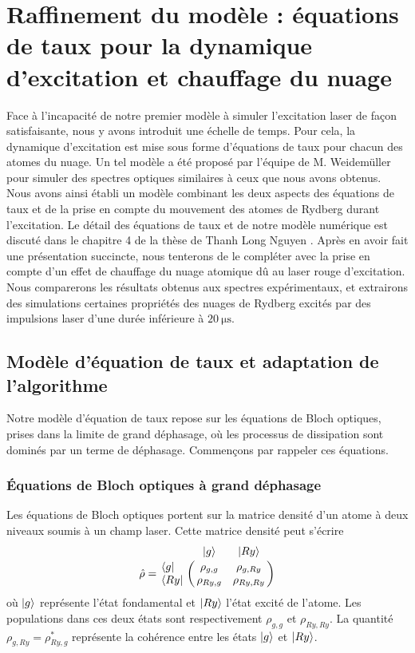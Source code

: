 \section{Raffinement du modèle : équations de taux pour la dynamique d'excitation et chauffage du nuage}
\noindent Face à l'incapacité de notre premier modèle à simuler l'excitation laser de façon satisfaisante, nous y avons introduit une échelle de temps.
Pour cela, la dynamique d'excitation est mise sous forme d'équations de taux pour chacun des atomes du nuage.
Un tel modèle a été proposé par l'équipe de M. Weidemüller \cite{MX_WEIDEMULLERRYDAGREGATES14} pour simuler des spectres optiques similaires à ceux que nous avons obtenus.
Nous avons ainsi établi un modèle combinant les deux aspects des équations de taux et de la prise en compte du mouvement des atomes de Rydberg durant l'excitation.
Le détail des équations de taux et de notre modèle numérique est discuté dans le chapitre 4 de la thèse de Thanh Long Nguyen \cite{PHD_NGUYEN}.
Après en avoir fait une présentation succincte, nous tenterons de le compléter avec la prise en compte d'un effet de chauffage du nuage atomique dû au laser rouge d'excitation.
Nous comparerons les résultats obtenus aux spectres expérimentaux, et extrairons des simulations certaines propriétés des nuages de Rydberg excités par des impulsions laser d'une durée inférieure à $\SI{20}{\us}$.
	
	\subsection{Modèle d'équation de taux et adaptation de l'algorithme}\label{subsec:rate_equation}
\noindent Notre modèle d'équation de taux repose sur les équations de Bloch optiques, prises dans la limite de grand déphasage, où les processus de dissipation sont dominés par un terme de déphasage.
Commençons par rappeler ces équations.

\subsubsection*{Équations de Bloch optiques à grand déphasage}
\noindent Les équations de Bloch optiques portent sur la matrice densité d'un atome à deux niveaux soumis à un champ laser.
Cette matrice densité peut s'écrire
\begin{equation}
\label{eq:density_matrix_Bloch}
\hat{\rho} = \bordermatrix{~ 	&\ket{g} 	& \ket{Ry} \cr
	\bra{g}		&\rho_{g,g}		&\rho_{g,Ry}	\cr 
	\bra{Ry} 		&\rho_{Ry,g}		&\rho_{Ry,Ry} \cr}
\end{equation}
où $\ket{g}$ représente l'état fondamental et $\ket{Ry}$ l'état excité de l'atome.
Les populations dans ces deux états sont respectivement $\rho_{g,g}$ et $\rho_{Ry,Ry}$.
La quantité $\rho_{g,Ry} = \rho_{Ry,g}^*$ représente la cohérence entre les états $\ket{g}$ et $\ket{Ry}$.

